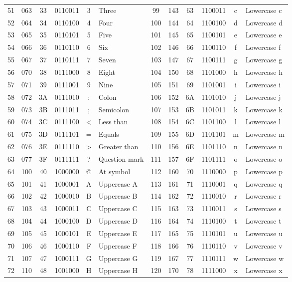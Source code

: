 \documentclass{article}
\begin{document}
{\begin{tabular}{ |c|c|c|c|c|l|c|c|c|c|c|l| }
  51 & 063 & 33& 0110011 & 3 & Three & 99 & 143 & 63& 1100011 &c&Lowercase c\\
  52 & 064 & 34& 0110100 & 4 & Four & 100 & 144 & 64& 1100100 &d&Lowercase d\\
  53 & 065 & 35& 0110101 & 5 & Five & 101 & 145 & 65& 1100101 &e&Lowercase e\\
  54 & 066 & 36& 0110110 & 6 & Six & 102 & 146 & 66& 1100110 &f&Lowercase f\\
  55 & 067 & 37& 0110111 & 7 & Seven & 103 & 147 & 67 &1100111 &g&Lowercase g\\
  56 & 070 & 38& 0111000 & 8 & Eight & 104 & 150 & 68& 1101000 &h&Lowercase h\\
  57 & 071 & 39& 0111001 & 9 & Nine & 105 & 151 & 69& 1101001 &i&Lowercase i\\
  58 & 072 & 3A& 0111010 & : & Colon & 106 & 152 & 6A& 1101010 &j&Lowercase j\\
  59 & 073 & 3B& 0111011 & ; & Semicolon & 107 & 153 & 6B& 1101011 &k&Lowercase k\\
  60 & 074 & 3C& 0111100 & < & Less than & 108 & 154 & 6C& 1101100 &l&Lowercase l\\
  61 & 075 & 3D& 0111101 & = & Equals & 109 & 155 & 6D& 1101101 &m&Lowercase m\\
  62 & 076 & 3E& 0111110 & > & Greater than & 110 & 156 & 6E& 1101110 &n&Lowercase n\\
  63 & 077 & 3F& 0111111 & ? & Question mark & 111 & 157 & 6F& 1101111 &o&Lowercase o\\
  64 & 100 & 40& 1000000 & @ & At symbol & 112 & 160 & 70& 1110000 &p&Lowercase p\\
  65 & 101 & 41& 1000001 & A & Uppercase A & 113 & 161 & 71& 1110001 &q&Lowercase q\\
  66 & 102 & 42& 1000010 & B& Uppercase B & 114 & 162 & 72& 1110010 &r&Lowercase r\\
  67 & 103 & 43& 1000011 &C&Uppercase C & 115 & 163 & 73& 1110011 &s&Lowercase s\\
  68 & 104 & 44& 1000100 &D&Uppercase D & 116 & 164 & 74& 1110100 &t&Lowercase t\\
  69 & 105 & 45& 1000101 &E&Uppercase E & 117 & 165 & 75& 1110101 &u&Lowercase u\\
  70 & 106 & 46& 1000110 &F&Uppercase F & 118 & 166 & 76& 1110110 &v&Lowercase v\\
  71 & 107 & 47& 1000111 &G&Uppercase G & 119 & 167 & 77& 1110111 &w&Lowercase w\\
  72 & 110 & 48& 1001000 &H&Uppercase H & 120 & 170 & 78& 1111000 &x&Lowercase x\\

\end{tabular}}
\end{document}
